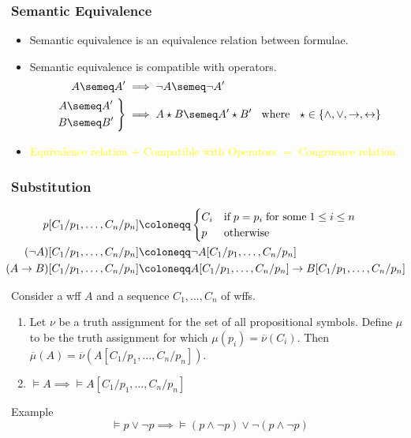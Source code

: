 \documentclass[UTF8,aspectratio=43,11pt,colorlinks,compress,openany]{beamer}%
\begin{document}
\begin{frame}\frametitle{Semantic Equivalence}
	\begin{itemize}
		\item Semantic equivalence is an equivalence relation between formulae.
		\item Semantic equivalence is compatible with operators.
\begin{align*}
A\semeq A'&\implies\neg A\semeq\neg A'\\
\left.
	\begin{aligned}
		A&\semeq A'\\
		B&\semeq B'
	\end{aligned}\;\right\}&\implies A\star B \semeq A'\star B' \;\;\mbox{ where }\;\; \star\in\{\wedge,\vee,\to,\leftrightarrow\}
\end{align*}
		\item \textcolor{yellow}{\small Equivalence relation $+$ Compatible with Operators $=$ Congruence relation}
	\end{itemize}
\end{frame}

\begin{frame}\frametitle{Substitution}\vspace*{-3ex}
	\begin{align*}
	p[C_1/p_1,\dots,C_n/p_n]&\coloneqq 
	\begin{cases}
	 C_i &\text{if}\;p=p_i\;\text{for some}\;1\leq i\leq n\\
	p &\text{otherwise}
	\end{cases}\\
	(\neg A)[C_1/p_1,\dots,C_n/p_n]&\coloneqq \neg A[C_1/p_1,\dots,C_n/p_n]\\
	\hspace*{-7pt}(A\to B)[C_1/p_1,\dots,C_n/p_n]&\coloneqq A[C_1/p_1,\dots,C_n/p_n]\to B[C_1/p_1,\dots,C_n/p_n]
	\end{align*}
	\begin{theorem}
		Consider a wff $A$ and a sequence $C_1,\dots,C_n$ of wffs.
		\begin{enumerate}
			\item Let $\nu$ be a truth assignment for the set of all propositional symbols. Define $\mu$ to be the truth assignment for which $\mu(p_i)=\overline{\nu}(C_i)$. Then $\overline{\mu}(A)=\overline{\nu}\left(A[C_1/p_1,\dots,C_n/p_n]\right)$.
			\item $\vDash A\implies\vDash A[C_1/p_1,\dots,C_n/p_n]$
		\end{enumerate}
	\end{theorem}
	\begin{block}{Example}
		\[\vDash p\vee\neg p\implies\vDash(p\wedge\neg p)\vee\neg(p\wedge\neg p)\]
	\end{block}
\end{frame}
\end{document}
